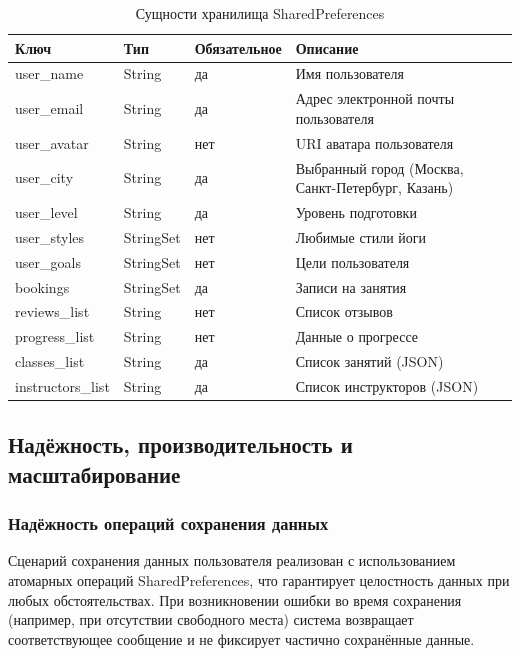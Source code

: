 \renewcommand{\arraystretch}{1.4}
\begin{table}[H]
	\centering
	\caption{Сущности хранилища SharedPreferences}
	\label{tab:sharedprefs}
	\normalsize
	\setlength{\tabcolsep}{6pt}
	\begin{tabular}{|m{3.3cm}|m{2.2cm}|m{3.5cm}|m{6.5cm}|}
		\hline
		\textbf{Ключ} & \textbf{Тип} & \textbf{Обязательное} & \textbf{Описание} \\
		\hline
		user\_name & String & да & Имя пользователя \\
		\hline
		user\_email & String & да & Адрес электронной почты пользователя \\
		\hline
		user\_avatar & String & нет & URI аватара пользователя \\
		\hline
		user\_city & String & да & Выбранный город (Москва, Санкт-Петербург, Казань) \\
		\hline
		user\_level & String & да & Уровень подготовки \\
		\hline
		user\_styles & StringSet & нет & Любимые стили йоги \\
		\hline
		user\_goals & StringSet & нет & Цели пользователя \\
		\hline
		bookings & StringSet & да & Записи на занятия \\
		\hline
		reviews\_list & String & нет & Список отзывов \\
		\hline
		progress\_list & String & нет & Данные о прогрессе \\
		\hline
		classes\_list & String & да & Список занятий (JSON) \\
		\hline
		instructors\_list & String & да & Список инструкторов (JSON) \\
		\hline
	\end{tabular}
\end{table}
\renewcommand{\arraystretch}{1}

\subsection{Надёжность, производительность и масштабирование}

\subsubsection{Надёжность операций сохранения данных}

Сценарий сохранения данных пользователя реализован с использованием атомарных операций SharedPreferences, что гарантирует целостность данных при любых обстоятельствах. При возникновении ошибки во время сохранения (например, при отсутствии свободного места) система возвращает соответствующее сообщение и не фиксирует частично сохранённые данные.

